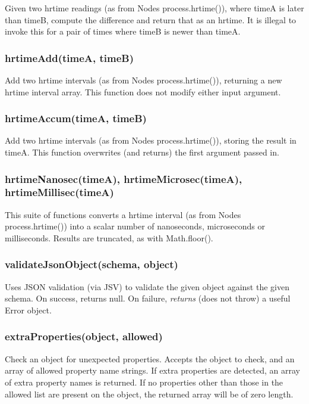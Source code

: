 Given two hrtime readings (as from Node\textquotesingle{}s {\ttfamily process.\+hrtime()}), where timeA is later than timeB, compute the difference and return that as an hrtime. It is illegal to invoke this for a pair of times where timeB is newer than timeA.

\subsubsection*{hrtime\+Add(time\+A, time\+B)}

Add two hrtime intervals (as from Node\textquotesingle{}s {\ttfamily process.\+hrtime()}), returning a new hrtime interval array. This function does not modify either input argument.

\subsubsection*{hrtime\+Accum(time\+A, time\+B)}

Add two hrtime intervals (as from Node\textquotesingle{}s {\ttfamily process.\+hrtime()}), storing the result in {\ttfamily timeA}. This function overwrites (and returns) the first argument passed in.

\subsubsection*{hrtime\+Nanosec(time\+A), hrtime\+Microsec(time\+A), hrtime\+Millisec(time\+A)}

This suite of functions converts a hrtime interval (as from Node\textquotesingle{}s {\ttfamily process.\+hrtime()}) into a scalar number of nanoseconds, microseconds or milliseconds. Results are truncated, as with {\ttfamily Math.\+floor()}.

\subsubsection*{validate\+Json\+Object(schema, object)}

Uses J\+S\+ON validation (via J\+SV) to validate the given object against the given schema. On success, returns null. On failure, {\itshape returns} (does not throw) a useful Error object.

\subsubsection*{extra\+Properties(object, allowed)}

Check an object for unexpected properties. Accepts the object to check, and an array of allowed property name strings. If extra properties are detected, an array of extra property names is returned. If no properties other than those in the allowed list are present on the object, the returned array will be of zero length.


